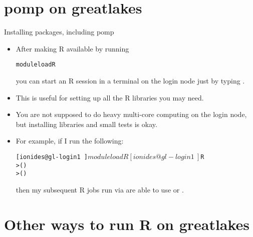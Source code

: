 \section{pomp on greatlakes}

\begin{frame}[fragile]{Installing packages, including pomp}

\begin{itemize}
\item After making R available by running
\begin{knitrout}\small
{}\color{fgcolor}\begin{kframe}
\begin{alltt}
module load R
\end{alltt}
\end{kframe}
\end{knitrout}
you can start an R session in a terminal on the login node just by typing .
\item This is useful for setting up all the R libraries you may need.
\item You are not supposed to do heavy multi-core computing on the login node, but installing libraries and small tests is okay.
\item For example, if I run the following:
\begin{knitrout}\small
{}\color{fgcolor}\begin{kframe}
\begin{alltt}
[ionides@gl-login1 ~]$ module load R
[ionides@gl-login1 ~]$ R
> ()
> ()
\end{alltt}
\end{kframe}
\end{knitrout}
then my subsequent R jobs run via  are able to use  or .

\end{itemize}


\end{frame}

\section{Other ways to run R on greatlakes}

